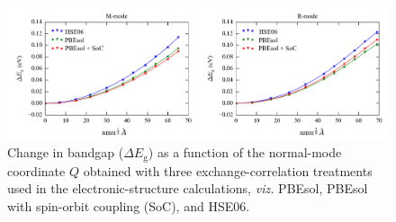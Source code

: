  
\begin{figure}[]
\includegraphics[width=\textwidth]{figures/ch5/fig_s4.png} 
\caption[Bandgap deformation potential at three levels of theory]{\label{Egtheory}
Change in bandgap ($\Delta E_\mathrm{g}$) as a function of the normal-mode coordinate $Q$ obtained with three exchange-correlation treatments used in the electronic-structure calculations, \textit{viz.} PBEsol, PBEsol with spin-orbit coupling (SoC), and HSE06.
}
\end{figure}


